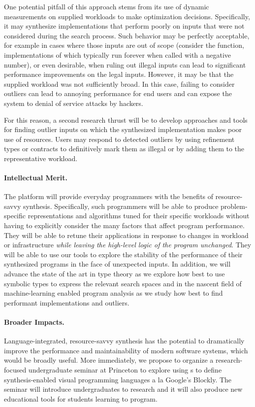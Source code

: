 One potential pitfall of this approach stems from its use of
dynamic measurements on supplied workloads to make optimization
decisions.  Specifically, it may synthesize implementations that 
perform poorly on inputs that were not considered during the
search process.  Such behavior may be perfectly acceptable, for example
in cases where those inputs are out of scope
(consider the  function, implementations of which typically run
forever when called with a negative number), or even desirable, when
ruling out illegal inputs can lead to significant performance
improvements on the legal inputs. 
However, it may be that the supplied
workload was not sufficiently broad.
In this case, failing to consider outliers can lead to annoying performance for end
users and can expose the system to denial of service attacks by hackers.

For this reason, a second research thrust will be to develop
approaches and tools for finding outlier inputs on which the
synthesized implementation makes poor use of resources.
Users may respond to detected outliers by using refinement types or
contracts to definitively mark them as illegal or by adding them
to the representative workload.



\paragraph*{Intellectual Merit.}
The \rasp platform will provide everyday programmers with the
benefits of resource-savvy synthesis.  Specifically, such programmers
will be able to produce problem-specific representations and
algorithms tuned for their specific workloads without having to
explicitly consider the many factors that affect program performance.
They will be able to retune their applications in response to changes
in workload or infrastructure 
\textit{while leaving the high-level logic of the program unchanged}.  
They will be able to use our tools to explore the stability of the
performance of their synthesized programs in the face of unexpected inputs.
In addition, we will advance the state of the art in type theory as we
explore how best to use symbolic types to express the relevant search
spaces and in the nascent field of machine-learning enabled program
analysis as we study how best to find performant implementations and
outliers.

\paragraph*{Broader Impacts.}
Language-integrated, resource-savvy synthesis has the potential to
dramatically improve the performance and maintainability of modern
software systems, which would be broadly useful.
More immediately, we propose to organize a research-focused
undergraduate seminar at Princeton to explore using \rasp{}s to define
synthesis-enabled visual programming languages a la Google's Blockly.
The seminar will introduce undergraduates to research and it will also
produce new educational tools for students learning to program.

